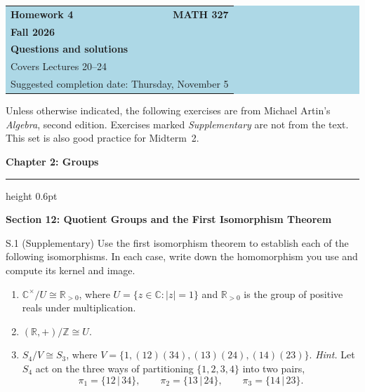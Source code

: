 \documentclass[11pt]{article}
\newcommand{\Z}{\mathbb{Z}}
\newcommand{\R}{\mathbb{R}}
\newcommand{\C}{\mathbb{C}}
\newcommand{\chapterheading}[1]{%
  \par\Needspace{12\baselineskip}\vspace{0.5em}
  {\color{courseblue}\Large\bfseries #1}\par\vspace{0.35em}
  {\color{boxborder}\hrule height 0.6pt}\vspace{0.35em}
}
\newcommand{\sectionheading}[1]{%
  \Needspace{8\baselineskip}
  \vspace{0.25em}
  {\color{darkgray}\large\bfseries #1}\par
}
\begin{document}
\begin{center}
  \colorbox{lightblue}{%
    \begin{minipage}{0.92\textwidth}
      \vspace{0.6em}
      \begin{tabular*}{\textwidth}{@{\extracolsep{\fill}}lr}
        {\color{courseblue}\bfseries\LARGE Homework 4} &
        {\color{courseblue}\bfseries\LARGE MATH 327}\\[0.4em]
        \multicolumn{2}{l}{\color{darkgray}\bfseries Fall 2026}\\[0.35em]
        \multicolumn{2}{l}{\color{courseblue}\bfseries Questions and solutions}\\[0.35em]
        \multicolumn{2}{l}{\color{darkgray}Covers Lectures 20--24}\\[0.2em]
        \multicolumn{2}{l}{\color{darkgray}Suggested completion date: Thursday, November 5}
      \end{tabular*}
      \vspace{0.5em}
    \end{minipage}}
\end{center}

\vspace{0.5em}

Unless otherwise indicated, the following exercises are from Michael Artin's
\emph{Algebra}, second edition. Exercises marked \emph{Supplementary} are
not from the text. This set is also good practice for Midterm~2.


\chapterheading{Chapter 2: Groups}

\sectionheading{Section 12: Quotient Groups and the First Isomorphism Theorem}

\begin{exercise}{S.1 (Supplementary)}
Use the first isomorphism theorem to establish each of the following
isomorphisms. In each case, write down the homomorphism you use and
compute its kernel and image.
\begin{enumerate}[label=\textbf{(\alph*)}]
  \item $\C^{\times}/U\cong\R_{>0}$, where $U=\{z\in\C:|z|=1\}$ and
        $\R_{>0}$ is the group of positive reals under multiplication.
  \item $(\R,+)/\Z\cong U$.
  \item $S_4/V\cong S_3$, where $V=\{1,(12)(34),(13)(24),(14)(23)\}$.
        \textit{Hint.} Let $S_4$ act on the three ways of partitioning
        $\{1,2,3,4\}$ into two pairs,
        \[
          \pi_1=\{12\,|\,34\},\qquad
          \pi_2=\{13\,|\,24\},\qquad
          \pi_3=\{14\,|\,23\}.
        \]
\end{enumerate}
\end{exercise}
\end{document}
